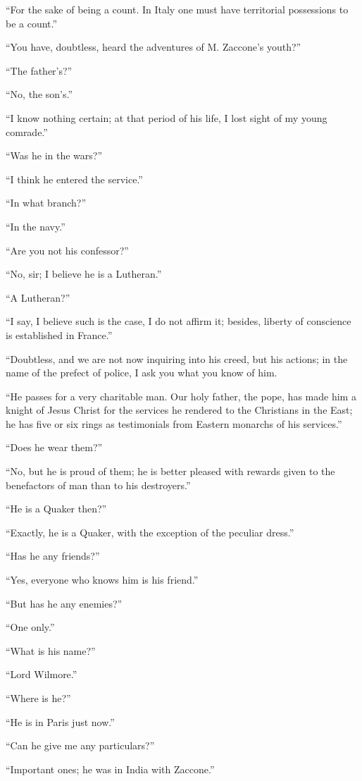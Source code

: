 “For the sake of being a count. In Italy one must have territorial
possessions to be a count.”

“You have, doubtless, heard the adventures of M. Zaccone’s youth?”

“The father’s?”

“No, the son’s.”

“I know nothing certain; at that period of his life, I lost sight of my
young comrade.”

“Was he in the wars?”

“I think he entered the service.”

“In what branch?”

“In the navy.”

“Are you not his confessor?”

“No, sir; I believe he is a Lutheran.”

“A Lutheran?”

“I say, I believe such is the case, I do not affirm it; besides,
liberty of conscience is established in France.”

“Doubtless, and we are not now inquiring into his creed, but his
actions; in the name of the prefect of police, I ask you what you know
of him.

“He passes for a very charitable man. Our holy father, the pope, has
made him a knight of Jesus Christ for the services he rendered to the
Christians in the East; he has five or six rings as testimonials from
Eastern monarchs of his services.”

“Does he wear them?”

“No, but he is proud of them; he is better pleased with rewards given
to the benefactors of man than to his destroyers.”

“He is a Quaker then?”

“Exactly, he is a Quaker, with the exception of the peculiar dress.”

“Has he any friends?”

“Yes, everyone who knows him is his friend.”

“But has he any enemies?”

“One only.”

“What is his name?”

“Lord Wilmore.”

“Where is he?”

“He is in Paris just now.”

“Can he give me any particulars?”

“Important ones; he was in India with Zaccone.”

